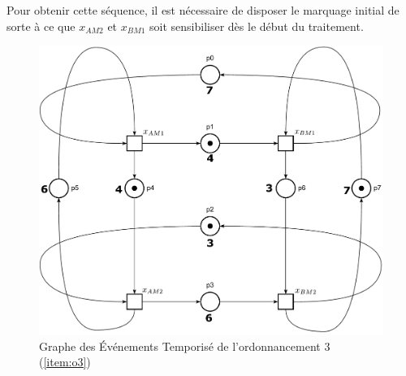 Pour obtenir cette séquence, il est nécessaire de disposer le marquage initial de sorte à ce que $x_{AM2}$ et $x_{BM1}$ soit sensibiliser dès le début du traitement.
\begin{figure}[!ht]
\centering
\includegraphics[width = \textwidth]{./II/images/GET_3.pdf}
\caption{\label{fig:get} Graphe des Événements Temporisé de l'ordonnancement 3 (\ref{item:o3})}
\end{figure}

